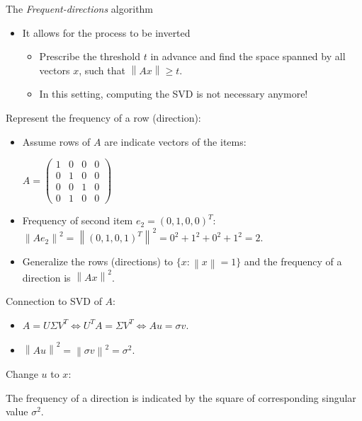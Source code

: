 \documentclass[first=dgreen,second=purple,logo=redque]{aaltoslides}
\newcommand{\vectornorm}[1]{\left\|#1\right\|}
\begin{document}
\begin{frame}[allowframebreaks=1]{The \textit{Frequent-directions} algorithm}
\begin{itemize}
  \item It allows for the process to be inverted
  \begin{itemize}
    \item Prescribe the threshold $t$ in advance and find the space spanned by all
vectors $x$, such that $\vectornorm{Ax} \geq t$.
    \item In this setting, computing the SVD is not necessary anymore!
   \end{itemize}
\end{itemize}

\framebreak
Represent the frequency of a row (direction):
\begin{itemize}
  \item Assume rows of $A$ are indicate vectors of the items: \\
  \begin{center}
  \vspace{2 mm}
  $A = \begin{pmatrix}
       1 & 0 & 0 & 0\\[0.3em] 
       0 & 1 & 0 & 0\\[0.3em]
       0 & 0 & 1 & 0\\[0.3em]
       0 & 1 & 0 & 0
     \end{pmatrix}$
  \end{center}
  \item Frequency of second item $e_2 = (0,1,0,0)^T$:
  $ \vectornorm{Ae_2}^2 = \vectornorm{(0,1,0,1)^T} ^2= 0^2 + 1^2 + 0^2 + 1^2 = 2$. 
  \item Generalize the rows (directions) to $\{x : \vectornorm{x}=1\} $ and the frequency of a direction is $\vectornorm{Ax}^2$.
\end{itemize}

\framebreak
Connection to SVD of $A$:
\begin{itemize}
  \item $A = U\Sigma V^T \Leftrightarrow U^TA = \Sigma V^T \Leftrightarrow Au = \sigma v$.
  \item $\vectornorm{Au}^2 = \vectornorm{\sigma v}^2 = \sigma^2$.
\end{itemize}
  \vspace{2 mm}
Change $u$ to $x$: \\
  \vspace{2 mm}

The frequency of a direction is indicated by the square of corresponding singular value $\sigma^2$.


\end{frame}
\end{document}
